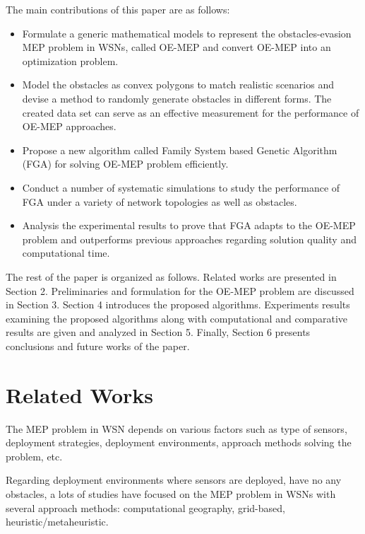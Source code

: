 \documentclass[final]{elsarticle}
\begin{document}
The main contributions of this paper are as follows:
\begin{itemize}
	\itemsep0em
	\item Formulate a generic mathematical models to represent the obstacles-evasion MEP problem in WSNs, called OE-MEP and convert OE-MEP into an optimization problem.
	\item Model the obstacles as convex polygons to match realistic scenarios and devise a method to randomly generate obstacles in different forms. The created data set can serve as an effective measurement for the performance of OE-MEP approaches.  
	\item Propose a new algorithm called Family System based Genetic Algorithm (FGA) for solving OE-MEP problem efficiently. 
	\item Conduct a number of systematic simulations to study the performance of FGA under a variety of network topologies as well as obstacles.
	\item Analysis the experimental results to prove that FGA adapts to the OE-MEP problem and outperforms previous approaches regarding solution quality and computational time.	
\end{itemize}
The rest of the paper is organized as follows. Related works are presented in Section 2. Preliminaries and formulation for the OE-MEP problem are discussed in Section 3. Section 4 introduces the proposed algorithms. Experiments results examining the proposed algorithms along with computational and comparative results are given and analyzed in Section 5. Finally, Section 6 presents conclusions and future works of the paper.
\section{Related Works}
The MEP problem in WSN depends on various factors such as type of sensors, deployment strategies, deployment environments, approach methods solving the problem, etc. 

Regarding deployment environments where sensors are deployed, have no any obstacles, a lots of studies have focused on the MEP problem in WSNs with several approach methods: computational geography, grid-based, heuristic/metaheuristic.
\end{document}

